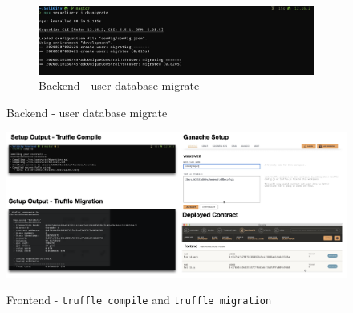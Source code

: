 \documentclass[12pt]{article}
\renewcommand{\_}{\kern-1.5pt\textunderscore\kern-1.5pt}
\begin{document}
\begin{figure}[ht]
\begin{minipage}[c]{0.5\linewidth}
\begin{subfigure}[b]{\textwidth}
		\end{subfigure}
		\begin{subfigure}[b]{\textwidth}
			\centering
			\includegraphics[width=\textwidth]{graphs/03. user_db_migrate}
			\caption{Backend - user database migrate}
		\end{subfigure}
	\end{minipage}
\end{figure}



\begin{figure}[H]
	\centering
	\includegraphics[width=16.5cm]{graphs/47. setup_2.png}\\
	\caption{Frontend - \texttt{truffle compile} and \texttt{truffle migration}}
	\label{fig:setup4}
\end{figure}
\end{document}
